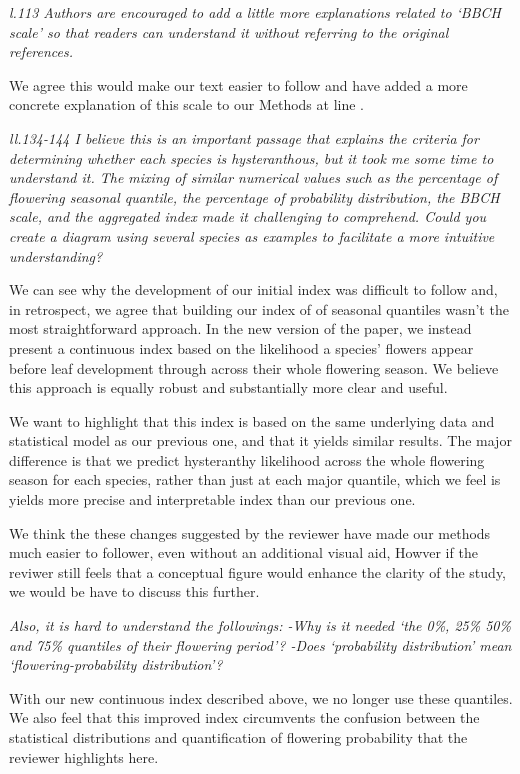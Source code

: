 \documentclass{article}[12pt]
\begin{document}
\emph{l.113 Authors are encouraged to add a little more explanations related to ‘BBCH scale’ so that readers can understand it without referring to the original references.}

We agree this would make our text easier to follow and have added a more concrete explanation of this scale to our Methods at line  .

\emph{ll.134-144 I believe this is an important passage that explains the criteria for determining whether each species is hysteranthous, but it took me some time to understand it. The mixing of similar numerical values such as the percentage of flowering seasonal quantile, the percentage of probability distribution, the BBCH scale, and the aggregated index made it challenging to comprehend. Could you create a diagram using several species as examples to facilitate a more intuitive understanding?}

We can see why the development of our initial index was difficult to follow and, in retrospect, we agree that building our index of of seasonal quantiles wasn't the most straightforward approach.  In the new version of the paper, we instead present a continuous index based on the likelihood a species' flowers appear before leaf development through across their whole flowering season. We believe this approach is equally robust and substantially more clear and useful. 

We want to highlight that this index is based on the same underlying data and statistical model as our previous one, and that it yields similar results. The major difference is that we predict hysteranthy likelihood across the whole flowering season for each species, rather than just at each major quantile, which we feel is yields more precise and interpretable index than our previous one.

We think the these changes suggested by the reviewer have made our methods much easier to follower, even without an additional visual aid, Howver if the reviwer still feels that a conceptual figure would enhance the clarity of the study, we would be have to discuss this further.

\emph{Also, it is hard to understand the followings:
-Why is it needed ‘the 0\%, 25\% 50\% and 75\% quantiles of their flowering period’?
-Does ‘probability distribution’ mean ‘flowering-probability distribution’?}

With our new continuous index described above, we no longer use these quantiles. We also feel that this improved index circumvents the confusion between the statistical distributions and quantification of flowering probability that the reviewer highlights here. 
\end{document}
